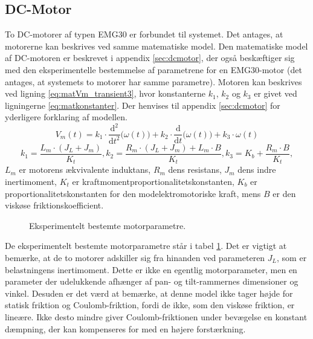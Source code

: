 \subsection{DC-Motor}
To DC-motorer af typen EMG30 er forbundet til systemet.
Det antages, at motorerne kan beskrives ved samme matematiske model.
Den matematiske model af DC-motoren er beskrevet i appendix \ref{sec:dcmotor},
der også beskæftiger sig med den eksperimentelle bestemmelse af parametrene for en EMG30-motor
(det antages, at systemets to motorer har samme parametre).
Motoren kan beskrives ved ligning \ref{eq:matVm_transient3}, hvor konstanterne \(k_1\), \(k_2\) og \(k_3\)
er givet ved ligningerne \ref{eq:matkonstanter}. Der henvises til appendix \ref{sec:dcmotor}
for yderligere forklaring af modellen.
\begin{equation}
	V_m\left(t\right)=k_1\cdot{}\frac{\mathrm d^2}{\mathrm d t^2} \big(\omega\left(t\right) \big)
		+k_2\cdot{}\frac{\mathrm d}{\mathrm d t} \big(\omega\left(t\right) \big)
		+k_3\cdot{}\omega\left(t\right)
	\label{eq:matVm_transient3}
 \end{equation}
\begin{equation}
	k_1=\frac{L_m\cdot{}\left(J_L+J_m\right)}{K_t},
	k_2=\frac{R_m\cdot{}\left(J_L+J_m\right)+L_m\cdot{}B}{K_t},
	k_3=K_b+\frac{R_m\cdot{}B}{K_t},
	\label{eq:matkonstanter} 
 \end{equation}
\(L_m\) er motorens ækvivalente induktans, \(R_m\) dens resistans, \(J_m\) dens indre inertimoment,
\(K_t\) er kraftmomentproportionalitetskonstanten, \(K_b\) er proportionalitetskonstanten for den modelektromotoriske kraft,
mens \(B\) er den viskøse friktionskoefficient.
\begin{figure}[th!]
	\centering
	
	\captionsetup{type=table}
	\caption[Motorparametre]
			{Eksperimentelt bestemte motorparametre.}
	\label{tb:matmotorparametre}
\end{figure}
De eksperimentelt bestemte motorparametre står i tabel \ref{tb:matmotorparametre}.
Det er vigtigt at bemærke, at de to motorer adskiller sig fra hinanden ved parameteren \(J_L\), som er belastningens
inertimoment. Dette er ikke en egentlig motorparameter, men en parameter der udelukkende afhænger
af pan- og tilt-rammernes dimensioner og vinkel.
Desuden er det værd at bemærke, at denne model ikke tager højde for statisk friktion og Coulomb-friktion,
fordi de ikke, som den viskøse friktion, er lineære. Ikke desto mindre giver Coulomb-friktionen under
bevægelse en konstant dæmpning, der kan kompenseres for med en højere forstærkning.

